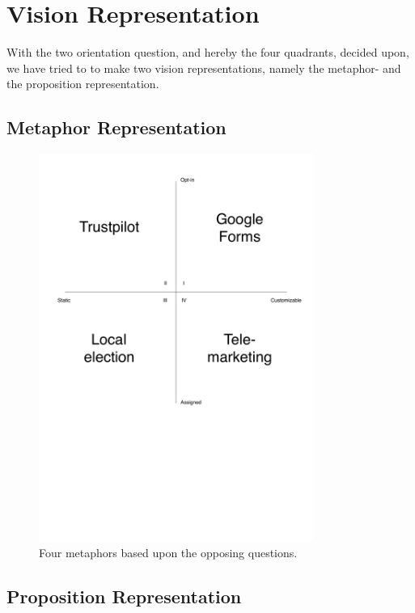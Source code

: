 
\section{Vision Representation}
\label{sec:vision_representation}

With the two orientation question, and hereby the four quadrants, decided upon, we have tried to to make two vision representations, namely the metaphor- and the proposition representation.

\subsection{Metaphor Representation}

\begin{figure}[!htbp]
	\centering
	\includegraphics[width=0.8\textwidth]{graphic/problem_analysis/vision/metaphor.pdf}
	\caption{Four metaphors based upon the opposing questions.}
	\label{fig:metaphor}
\end{figure}
\FloatBarrier

\subsection{Proposition Representation}

